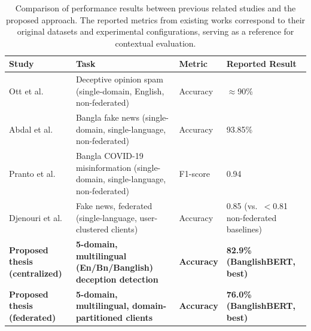 \begin{table}[htbp]
\centering
\caption{Comparison of performance results between previous related studies and the proposed approach. The reported metrics from existing works correspond to their original datasets and experimental configurations, serving as a reference for contextual evaluation.}
\label{tab:related-work}
\begin{tabular}{|p{3.6cm}|p{4.4cm}|p{2.1cm}|p{3.4cm}|}
\hline
\textbf{Study} & \textbf{Task} & \textbf{Metric} & \textbf{Reported Result} \\
\hline
Ott et al.\ \cite{ott2011finding} &
Deceptive opinion spam (single-domain, English, non-federated) &
Accuracy &
$\approx$90\% \\
\hline

Abdal et al.\ \cite{abdal2023transformer} &
Bangla fake news (single-domain, single-language, non-federated) &
Accuracy &
93.85\% \\
\hline

Pranto et al.\ \cite{pranto2022misinformed} &
Bangla COVID-19 misinformation (single-domain, single-language, non-federated) &
F1-score &
0.94 \\
\hline

Djenouri et al.\ \cite{djenouri2024federated} &
Fake news, federated (single-language, user-clustered clients) &
Accuracy &
0.85 (vs.\ $<$0.81 non-federated baselines) \\
\hline

\textbf{Proposed thesis (centralized)} &
\textbf{5-domain, multilingual (En/Bn/Banglish) deception detection} &
\textbf{Accuracy} &
\textbf{82.9\% (BanglishBERT, best)} \\
\hline

\textbf{Proposed thesis (federated)} &
\textbf{5-domain, multilingual, domain-partitioned clients} &
\textbf{Accuracy} &
\textbf{76.0\% (BanglishBERT, best)} \\
\hline

\end{tabular}
\end{table}
